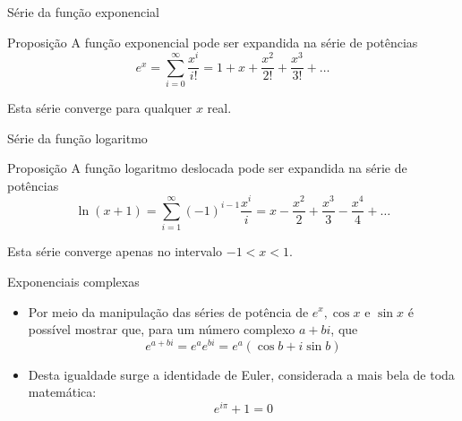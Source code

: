 \begin{frame}[fragile]{Série da função exponencial}

    \begin{block}{Proposição}
        A função exponencial pode ser expandida na série de potências
        $$
            e^x = \sum_{i = 0}^\infty \frac{x^i}{i!} = 1 + x + \frac{x^2}{2!} + \frac{x^3}{3!} + \ldots
        $$

        Esta série converge para qualquer $x$ real.
    \end{block}

\end{frame}


\begin{frame}[fragile]{Série da função logaritmo}

    \begin{block}{Proposição}
        A função logaritmo deslocada pode ser expandida na série de potências
        $$
            \ln (x + 1) = \sum_{i = 1}^\infty (-1)^{i - 1}\frac{x^i}{i} = x - \frac{x^2}{2} + \frac{x^3}{3} - \frac{x^4}{4} + \ldots
        $$

        Esta série converge apenas no intervalo $-1 < x < 1$.
    \end{block}

\end{frame}

\begin{frame}[fragile]{Exponenciais complexas}

    \begin{itemize}
        \item Por meio da manipulação das séries de potência de $e^x, \cos x$ e $\sin x$ é possível mostrar que, para um número complexo $a + bi$, que
            $$
            e^{a + bi} = e^ae^{bi} = e^a(\cos b + i\sin b)
            $$

        \item Desta igualdade surge a identidade de Euler, considerada a mais bela de toda matemática:
            $$
                e^{i\pi} + 1 = 0
            $$
    \end{itemize}

\end{frame}

